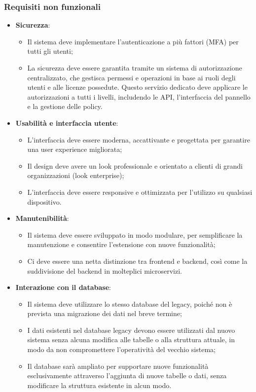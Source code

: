 \subsubsection{Requisiti non funzionali}
\begin{itemize}
  \item \textbf{Sicurezza}:
    \begin{itemize}
      \item Il sistema deve implementare l’autenticazione a più fattori (MFA) per tutti gli utenti;
      \item La sicurezza deve essere garantita tramite un sistema di autorizzazione centralizzato, che gestisca permessi e operazioni in base ai ruoli degli utenti e alle licenze possedute. Questo servizio dedicato deve applicare le autorizzazioni a tutti i livelli, includendo le API, l’interfaccia del pannello e la gestione delle policy.
    \end{itemize}

  \item \textbf{Usabilità e interfaccia utente}:
    \begin{itemize}
      \item L’interfaccia deve essere moderna, accattivante e progettata per garantire una user experience migliorata;
      \item Il design deve avere un look professionale e orientato a clienti di grandi organizzazioni (look enterprise);
      \item L’interfaccia deve essere responsive e ottimizzata per l’utilizzo su qualsiasi dispositivo.
    \end{itemize}

  \item \textbf{Manutenibilità}:
    \begin{itemize}
      \item Il sistema deve essere sviluppato in modo modulare, per semplificare la manutenzione e consentire l’estensione con nuove funzionalità;
      \item Ci deve essere una netta distinzione tra frontend e backend, così come la suddivisione del backend in molteplici microservizi.
    \end{itemize}

  \item \textbf{Interazione con il database}:
    \begin{itemize}
      \item Il sistema deve utilizzare lo stesso database del legacy, poiché non è prevista una migrazione dei dati nel breve termine;
      \item I dati esistenti nel database legacy devono essere utilizzati dal nuovo sistema senza alcuna modifica alle tabelle o alla struttura attuale, in modo da non compromettere l’operatività del vecchio sistema;
      \item Il database sarà ampliato per supportare nuove funzionalità esclusivamente attraverso l’aggiunta di nuove tabelle o dati, senza modificare la struttura esistente in alcun modo.
    \end{itemize}
\end{itemize}
